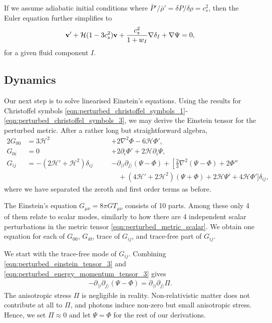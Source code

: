 If we assume adiabatic initial conditions where $\bar{P}'/\bar{\rho}' = \delta P / \delta \rho = c^2_s$, then the Euler equation further simplifies to
\begin{align}
	\mathbf{v}' + \mathcal{H} (1 - 3c^2_s) \mathbf{v} + \frac{c^2_s}{1+w_I} \nabla\delta_I + \nabla\Psi = 0,
\end{align}
for a given fluid component $I$.


\subsection{Dynamics}

Our next step is to solve linearised Einstein's equations. Using the results for Christoffel symbols \eqref{eqn:perturbed_christoffel_symbols_1}-\eqref{eqn:perturbed_christoffel_symbols_3}, we may derive the Einstein tensor for the perturbed metric. After a rather long but straightforward algebra,
\begin{alignat}{2}
	G_{00} &= 3\mathcal{H}^2 \quad&&+ 2\nabla^2 \Phi - 6 \mathcal{H} \Phi', \label{eqn:perturbed_einstein_tensor_1}\\
	G_{0i} &= 0 \quad&&+ 2\partial_i \Phi' + 2 \mathcal{H} \partial_i \Psi, \label{eqn:perturbed_einstein_tensor_2}\\
	G_{ij} &= -(2\mathcal{H}' + \mathcal{H}^2) \delta_{ij} \quad&&- \partial_{\langle i} \partial_{j \rangle} (\Psi - \Phi) + \left[ \frac{2}{3}\nabla^2 (\Psi-\Phi) + 2\Phi'' \right. \nonumber\\
	& &&\quad + (4\mathcal{H}' + 2\mathcal{H}^2)(\Psi+\Phi) + 2\mathcal{H}\Psi' + 4\mathcal{H}\Phi' \biggr] \delta_{ij}, \label{eqn:perturbed_einstein_tensor_3}
\end{alignat}
where we have separated the zeroth and first order terms as before.

The Einstein's equation $G_{\mu\nu} = 8\pi G T_{\mu\nu}$ consists of 10 parts. Among these only 4 of them relate to scalar modes, similarly to how there are 4 independent scalar perturbations in the metric tensor \eqref{eqn:perturbed_metric_scalar}. We obtain one equation for each of $G_00$, $G_{i0}$, trace of $G_{ij}$, and trace-free part of $G_{ij}$.

We start with the trace-free mode of $G_{ij}$. Combining  \eqref{eqn:perturbed_einstein_tensor_3} and \eqref{eqn:perturbed_energy_momentum_tensor_3} gives
\begin{align}
	-\partial_{\langle i} \partial_{j \rangle} (\Psi - \Phi) = \partial_{\langle i} \partial_{j \rangle} \Pi.
\end{align}
The anisotropic stress $\Pi$ is negligible in reality. Non-relativistic matter does not contribute at all to $\Pi$, and photons induce non-zero but small anisotropic stress. Hence, we set $\Pi\approx 0$ and let $\Psi = \Phi$ for the rest of our derivations.


